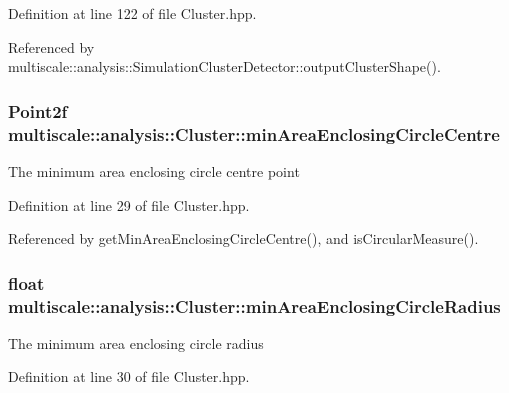 Definition at line 122 of file Cluster.\-hpp.



Referenced by multiscale\-::analysis\-::\-Simulation\-Cluster\-Detector\-::output\-Cluster\-Shape().

\hypertarget{classmultiscale_1_1analysis_1_1Cluster_a47e672060b4025dcd07ebb9c5fd99f0c}{
\subsubsection[{min\-Area\-Enclosing\-Circle\-Centre}]{\setlength{\rightskip}{0pt plus 5cm}Point2f multiscale\-::analysis\-::\-Cluster\-::min\-Area\-Enclosing\-Circle\-Centre\hspace{0.3cm}{\ttfamily [private]}}}\label{classmultiscale_1_1analysis_1_1Cluster_a47e672060b4025dcd07ebb9c5fd99f0c}
The minimum area enclosing circle centre point 

Definition at line 29 of file Cluster.\-hpp.



Referenced by get\-Min\-Area\-Enclosing\-Circle\-Centre(), and is\-Circular\-Measure().

\hypertarget{classmultiscale_1_1analysis_1_1Cluster_a070994481884a4c7f5aa4879ce7b0568}{
\subsubsection[{min\-Area\-Enclosing\-Circle\-Radius}]{\setlength{\rightskip}{0pt plus 5cm}float multiscale\-::analysis\-::\-Cluster\-::min\-Area\-Enclosing\-Circle\-Radius\hspace{0.3cm}{\ttfamily [private]}}}\label{classmultiscale_1_1analysis_1_1Cluster_a070994481884a4c7f5aa4879ce7b0568}
The minimum area enclosing circle radius 

Definition at line 30 of file Cluster.\-hpp.



